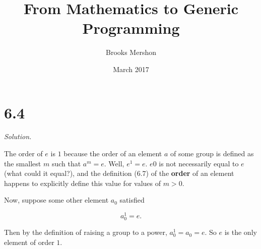 \documentclass{article}
\title{From Mathematics to Generic Programming}
\author{Brooks Mershon}
\date{March 2017}
\begin{document}
\maketitle

\section*{6.4}

\textit{Solution.}

The order of $e$ is $1$ because the order of an element $a$ of some group is defined as the smallest $m$ such that $a^m = e$. Well, $e^1 = e$. $e0$ is not necessarily equal to $e$ (what could it equal?), and the definition (6.7) of the \textbf{order} of an element happens to explicitly define this value for values of $m > 0$.

Now, suppose some other element $a_0$ satisfied

$$a_0^1 = e.$$

Then by the definition of raising a group to a power, $a_0^1 = a_0 = e$. So $e$ is the only element of order $1$.
\end{document}
